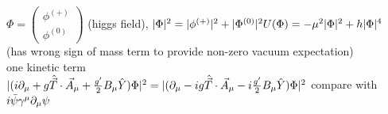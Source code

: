 \documentclass[12pt]{amsart}
\begin{document}
\begin{enumerate}
$\Phi = \begin{pmatrix} \phi^{(+)} \\ \phi^{(0)} \end{pmatrix}$ (higgs field), $|\Phi|^2 = |\phi^{(+)}|^2 + |\Phi^{(0)}|^2\\
U(\Phi) = - \mu^2 | \Phi|^2 + h | \Phi|^4$ (has wrong sign of mass term to provide non-zero vacuum expectation)\\
one kinetic term\\
$|(i \partial_{\mu} + g \hat{\vec{T}} \cdot \vec{A}_{\mu} + \frac{g'}{2} B_{\mu} \hat{Y}) \Phi|^2 = |(\partial_{\mu} - i g \hat{\vec{T}} \cdot \vec{A}_{\mu} - i \frac{g'}{2} B_{\mu} \hat{Y}) \Phi|^2\\$
compare with $i \bar{\psi} \gamma^{\mu} \partial_{\mu} \psi\\$


\hdashrule[0.5ex][c]{\linewidth}{0.5pt}{1.5mm}



\end{enumerate}
\end{document}
